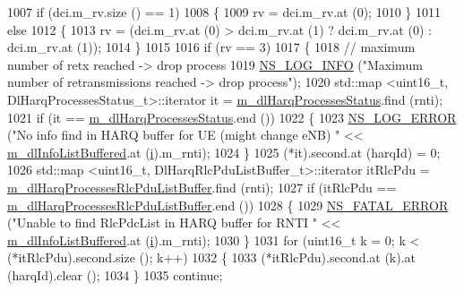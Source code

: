 \begin{DoxyCode}
1007           \textcolor{keywordflow}{if} (dci.m\_rv.size () == 1)
1008             \{
1009               rv = dci.m\_rv.at (0);
1010             \}
1011           \textcolor{keywordflow}{else}
1012             \{
1013               rv = (dci.m\_rv.at (0) > dci.m\_rv.at (1) ? dci.m\_rv.at (0) : dci.m\_rv.at (1));
1014             \}
1015 
1016           \textcolor{keywordflow}{if} (rv == 3)
1017             \{
1018               \textcolor{comment}{// maximum number of retx reached -> drop process}
1019               \hyperlink{group__logging_gafbd73ee2cf9f26b319f49086d8e860fb}{NS\_LOG\_INFO} (\textcolor{stringliteral}{"Maximum number of retransmissions reached -> drop process"});
1020               std::map <uint16\_t, DlHarqProcessesStatus\_t>::iterator it = 
      \hyperlink{classns3_1_1CqaFfMacScheduler_ad68bd0730def22b00204de5f3a8fb109}{m\_dlHarqProcessesStatus}.find (rnti);
1021               \textcolor{keywordflow}{if} (it == \hyperlink{classns3_1_1CqaFfMacScheduler_ad68bd0730def22b00204de5f3a8fb109}{m\_dlHarqProcessesStatus}.end ())
1022                 \{
1023                   \hyperlink{group__logging_ga0261a8db1d4ac5f79417d117634fd455}{NS\_LOG\_ERROR} (\textcolor{stringliteral}{"No info find in HARQ buffer for UE (might change eNB) "} << 
      \hyperlink{classns3_1_1CqaFfMacScheduler_aabc929a8c1c30338a5fa0826bb7cd2b8}{m\_dlInfoListBuffered}.at (\hyperlink{bernuolliDistribution_8m_a6f6ccfcf58b31cb6412107d9d5281426}{i}).m\_rnti);
1024                 \}
1025               (*it).second.at (harqId) = 0;
1026               std::map <uint16\_t, DlHarqRlcPduListBuffer\_t>::iterator itRlcPdu =  
      \hyperlink{classns3_1_1CqaFfMacScheduler_a019cbb20e91d699a8c7e26fb8d69ff4e}{m\_dlHarqProcessesRlcPduListBuffer}.find (rnti);
1027               \textcolor{keywordflow}{if} (itRlcPdu == \hyperlink{classns3_1_1CqaFfMacScheduler_a019cbb20e91d699a8c7e26fb8d69ff4e}{m\_dlHarqProcessesRlcPduListBuffer}.end ())
1028                 \{
1029                   \hyperlink{group__fatal_ga5131d5e3f75d7d4cbfd706ac456fdc85}{NS\_FATAL\_ERROR} (\textcolor{stringliteral}{"Unable to find RlcPdcList in HARQ buffer for RNTI "} << 
      \hyperlink{classns3_1_1CqaFfMacScheduler_aabc929a8c1c30338a5fa0826bb7cd2b8}{m\_dlInfoListBuffered}.at (\hyperlink{bernuolliDistribution_8m_a6f6ccfcf58b31cb6412107d9d5281426}{i}).m\_rnti);
1030                 \}
1031               \textcolor{keywordflow}{for} (uint16\_t k = 0; k < (*itRlcPdu).second.size (); k++)
1032                 \{
1033                   (*itRlcPdu).second.at (k).at (harqId).clear ();
1034                 \}
1035               \textcolor{keywordflow}{continue};

\end{DoxyCode}
